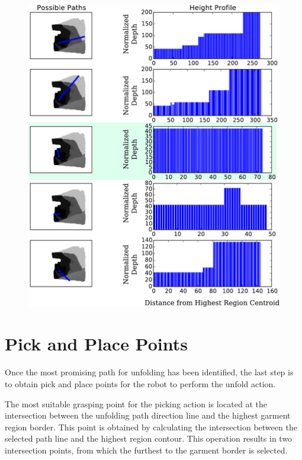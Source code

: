 \begin{figure}[thpb]
    \centering
    \includegraphics[width=\textwidth]{figures/candidate_paths.pdf}
    \caption{}
    \label{fig:paths_with_bumpiness}
\end{figure}

\section{Pick and Place Points}
\label{pick_and_place}
Once the most promising path for unfolding has been identified, the last step is to obtain pick and place points for the robot to perform the unfold action.


The most suitable grasping point for the picking action is located at the  intersection between the unfolding path direction line and the highest garment region border. This point is obtained by calculating the intersection between the selected path line and the highest region contour. This operation results in two intersection points, from which the furthest to the garment border is selected.

